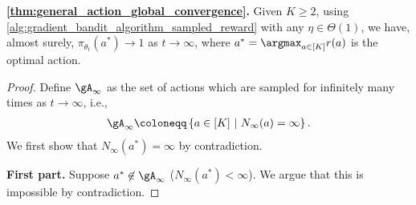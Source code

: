 \textbf{\cref{thm:general_action_global_convergence}.}
Given $K \ge 2$, using \cref{alg:gradient_bandit_algorithm_sampled_reward} with any $\eta \in \Theta(1)$, we have, almost surely, $\pi_{\theta_t}(a^*) \to 1$ as $t \to \infty$, where $a^* = \argmax_{a \in [K]}{ r(a) }$ is the optimal action.
\begin{proof}
Define $\gA_\infty$ as the set of actions which are sampled for infinitely many times as $t \to \infty$, i.e.,
\begin{align}
    \gA_\infty \coloneqq \left\{ a \in [K] \ | \ N_\infty(a) = \infty \right\}.
\end{align}
We first show that $N_\infty(a^*) = \infty$ by contradiction.

\textbf{First part.} Suppose $a^* \not\in \gA_\infty$ ($N_\infty(a^*) < \infty$). We argue that this is impossible by contradiction.


\end{proof}
